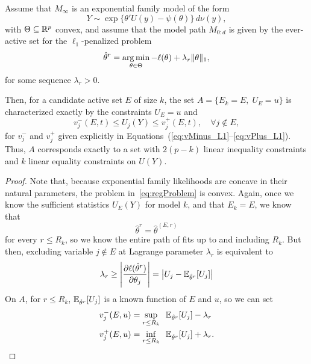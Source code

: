 \documentclass{article}
\begin{document}
\begin{theorem}
  Assume that $M_\infty$ is an exponential family model
  of the form
  \[
  Y \sim \exp\{ \theta'U(y) - \psi(\theta) \}\,d\nu(y),
  \]
  with $\Theta \subseteq \mathbb{R}^p$ convex, and assume
  that the model path $M_{0:d}$ is given 
  by the ever-active set for the $\ell_1$-penalized problem
  \begin{equation}\label{eq:regProblem}
  \hat\theta^r = \operatorname*{arg\,min}_{\theta\in \Theta} 
  -\ell(\theta) + \lambda_r\|\theta\|_1,
  \end{equation}
  for some sequence $\lambda_r > 0$.

  Then, for a candidate active set $E$ of size $k$, 
  the set $A = \{E_k = E, \;U_E = u\}$ is characterized 
  exactly by the constraints $U_E = u$ and
  \[
  v_j^-(E,t) \leq U_j(Y) \leq v_j^+(E,t), \quad\forall j \notin E,
  \]
  for $v_j^-$ and $v_j^+$ given explicitly in
  Equations~(\ref{eq:vMinus_L1}--\ref{eq:vPlus_L1}).
  Thus, $A$ corresponds exactly to 
  a set with $2(p-k)$ linear inequality constraints and $k$
  linear equality constraints on $U(Y)$.
\end{theorem}

\begin{proof}
  Note that, because exponential family likelihoods are concave in their natural parameters, the problem in~\eqref{eq:regProblem} is convex. Again, once we know the sufficient statistics $U_E(Y)$ for model $k$, and that $E_k=E$, we know that
  \[
  \hat\theta^r = \hat\theta^{(E,r)}
  \]
  for every $r \leq R_k$, so we know the entire path of fits up to and including $R_k$. But then, excluding variable $j \notin E$ at Lagrange parameter $\lambda_r$ is equivalent to
  \[
  \lambda_r \geq 
  \left| \frac{\partial \ell(\hat\theta^r)}{\partial \theta_j} \right|
  = \left|U_j - \mathbb{E}_{\hat\theta^r}[U_j]\right|
  \]
  On $A$, for $r \leq R_k$, 
  $\mathbb{E}_{\hat\theta^r}[U_j]$ is a known function of $E$ and $u$,
  so we can set
  \begin{align}\label{eq:vMinus_L1}
    v_j^-(E,u) &= \sup_{r \leq R_k} \;\; 
    \mathbb{E}_{\hat\theta^r}[U_j] - \lambda_r \\
    \label{eq:vPlus_L1}
    v_j^+(E,u) &= \inf_{r \leq R_k} \;\;
    \mathbb{E}_{\hat\theta^r}[U_j] + \lambda_r .
  \end{align}
\end{proof}

\end{document}
